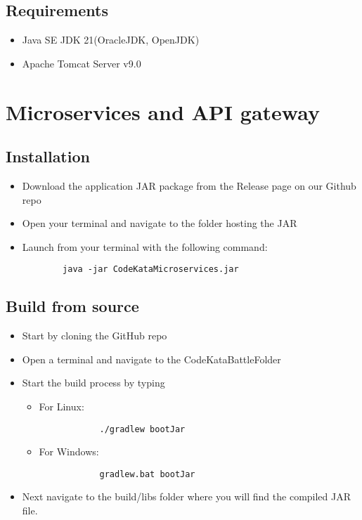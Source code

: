 \subsection{Requirements}
\begin{itemize}
    \item Java SE JDK 21(OracleJDK, OpenJDK)
    \item Apache Tomcat Server v9.0
\end{itemize}
\section{Microservices and API gateway}
\subsection{Installation}
\begin{itemize}
    \item Download the application JAR package from the Release page on our Github repo
    \item Open your terminal and navigate to the folder hosting the JAR
    \item Launch from your terminal with the following command:
    \begin{verbatim}
        java -jar CodeKataMicroservices.jar
    \end{verbatim}
\end{itemize}
\newpage
\subsection{Build from source}
\begin{itemize}
    \item Start by cloning the GitHub repo
    \item Open a terminal and navigate to the CodeKataBattleFolder
    \item Start the build process by typing
    \begin{itemize}
        \item For Linux:\begin{verbatim}
            ./gradlew bootJar
        \end{verbatim}
        \item For Windows:\begin{verbatim}
            gradlew.bat bootJar
        \end{verbatim}
    \end{itemize}
    \item Next navigate to the build/libs folder where you will find the compiled JAR file.
\end{itemize}
